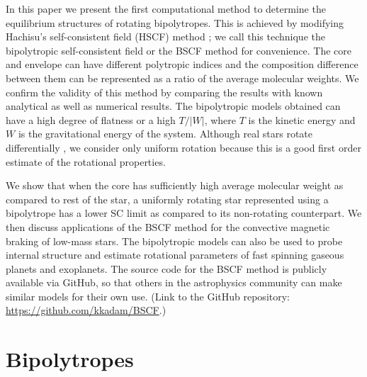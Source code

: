 \documentclass[a4paper,fleqn,usenatbib]{mnras}
\begin{document}
In this paper we present the first computational method to determine the equilibrium structures of rotating bipolytropes. This is achieved by modifying Hachisu's self-consistent field (HSCF) method \citep{Hachisu1986a}; we call this technique the bipolytropic self-consistent field or the BSCF method for convenience. The core and envelope can have different polytropic indices and the composition difference between them can be represented as a ratio of the average molecular weights. We confirm the validity of this method by comparing the results with known analytical as well as numerical results. 
The bipolytropic models obtained can have a high degree of flatness or a high $T/|W|$, where $T$ is the kinetic energy and $W$ is the gravitational energy of the system.  
Although real stars rotate differentially \citep{Zeipel1925}, we consider only uniform rotation because this is a good first order estimate of the rotational properties. 

We show that when the core has sufficiently high average molecular weight as compared to rest of the star, a uniformly rotating star represented using a bipolytrope has a lower SC limit as compared to its non-rotating counterpart.
We then discuss applications of the BSCF method for the convective magnetic braking of low-mass stars. The bipolytropic models can also be used to probe internal structure and estimate rotational parameters of fast spinning gaseous planets and exoplanets.
The source code for the BSCF method is publicly
available via GitHub, so that others in the astrophysics community can make similar models for their own use. (Link to the GitHub repository: \href{https://github.com/kkadam/BSCF}{https://github.com/kkadam/BSCF}.)



\section{Bipolytropes}
\end{document}
